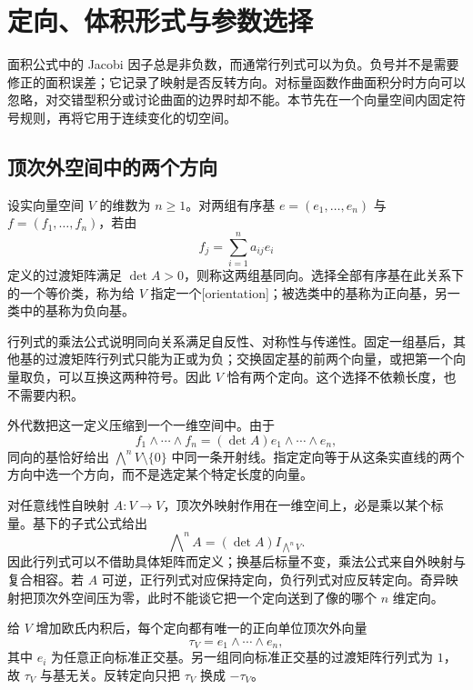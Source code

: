 \section{定向、体积形式与参数选择}
\label{b1:sec:B105}

面积公式中的 Jacobi 因子总是非负数，而通常行列式可以为负。负号并不是需要修正的面积误差；它记录了映射是否反转方向。对标量函数作曲面积分时方向可以忽略，对交错型积分或讨论曲面的边界时却不能。本节先在一个向量空间内固定符号规则，再将它用于连续变化的切空间。

\subsection{顶次外空间中的两个方向}
\label{b1:subsec:B10501}

\begin{definition}\label{b1:def:app-b-orientation}
设实向量空间 \(V\) 的维数为 \(n\geq1\)。对两组有序基 \(e=(e_1,\ldots,e_n)\) 与 \(f=(f_1,\ldots,f_n)\)，若由
\[
 f_j=\sum_{i=1}^n a_{ij}e_i
\]
定义的过渡矩阵满足 \(\det A>0\)，则称这两组基同向。选择全部有序基在此关系下的一个等价类，称为给 \(V\) 指定一个[orientation]；被选类中的基称为正向基，另一类中的基称为负向基。
\end{definition}

行列式的乘法公式说明同向关系满足自反性、对称性与传递性。固定一组基后，其他基的过渡矩阵行列式只能为正或为负；交换固定基的前两个向量，或把第一个向量取负，可以互换这两种符号。因此 \(V\) 恰有两个定向。这个选择不依赖长度，也不需要内积。

\ProseParagraphBreak

外代数把这一定义压缩到一个一维空间中。由于
\[
 f_1\wedge\cdots\wedge f_n
  =(\det A)e_1\wedge\cdots\wedge e_n,
\]
同向的基恰好给出 \(\bigwedge^nV\setminus\{0\}\) 中同一条开射线。指定定向等于从这条实直线的两个方向中选一个方向，而不是选定某个特定长度的向量。

\ProseParagraphBreak

对任意线性自映射 \(A:V\rightarrow V\)，顶次外映射作用在一维空间上，必是乘以某个标量。基下的子式公式给出
\[
 \bigwedge\nolimits^n A=(\det A)I_{\bigwedge^nV}.
\]
因此行列式可以不借助具体矩阵而定义；换基后标量不变，乘法公式来自外映射与复合相容。若 \(A\) 可逆，正行列式对应保持定向，负行列式对应反转定向。奇异映射把顶次外空间压为零，此时不能谈它把一个定向送到了像的哪个 \(n\) 维定向。

\ProseParagraphBreak

给 \(V\) 增加欧氏内积后，每个定向都有唯一的正向单位顶次外向量
\[
 \tau_V=e_1\wedge\cdots\wedge e_n,
\]
其中 \(e_i\) 为任意正向标准正交基。另一组同向标准正交基的过渡矩阵行列式为 \(1\)，故 \(\tau_V\) 与基无关。反转定向只把 \(\tau_V\) 换成 \(-\tau_V\)。

